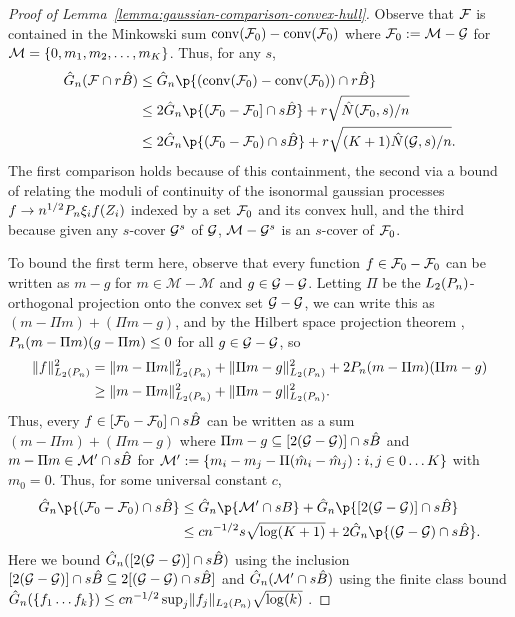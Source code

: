 \begin{proof}[Proof of Lemma~\ref{lemma:gaussian-comparison-convex-hull}]
Observe that $\mathcal{F}$ is contained in the Minkowski sum $\operatorname*{conv}(\mathcal{F}_0)-\operatorname*{conv}(\mathcal{F}_0)$
where $\mathcal{F}_0 := \mathcal M - \mathcal{G}$ for $\mathcal M = \{0, m_1, m_2, \ldots, m_K\}$. Thus, for any $s$,
\begin{align*} 
\hat G_n(\F \cap r \hat B) 
&\le \hat G_n\p{(\conv(\F_0) - \conv(\F_0)) \cap r \hat B} \\
&\le 2\hat G_n\p{(\F_0 - \F_0] \cap s \hat B} + r \sqrt{\hat N(\F_0, s)/n} \\
&\le 2\hat G_n\p{(\F_0 - \F_0) \cap s \hat B} + r \sqrt{(K+1)\hat N(\GG, s)/n}. 
\end{align*}
The first comparison holds because of this containment, the second via a bound of \citet[Theorem 1]{bousquet2002some}
relating the moduli of continuity of the isonormal gaussian processes $f \to n^{1/2}\Pn \xi_i f(Z_i)$
indexed by a set $\mathcal{F}_0$ and its convex hull, and the third because given any $s$-cover $\mathcal{G}^s$ 
of $\mathcal{G}$, $\mathcal M -  \mathcal{G}^s$ is an $s$-cover of $\mathcal{F}_0$.

To bound the first term here, observe that every function $f \in \mathcal{F}_0-\mathcal{F}_0$
can be written as $m - g$ for $m \in \mathcal M - \mathcal M$ and $g \in \mathcal{G}-\mathcal{G}$.
Letting $\Pi$ be the $L_2(\Pn)$-orthogonal projection onto the convex set $\mathcal{G}-\mathcal{G}$, we can write this as
$(m - \Pi m) + (\Pi m - g)$, and by the Hilbert space projection theorem \citep[Proposition 1.37]{peypouquet2015convex},
$\Pn (m-\Pi m) (g-\Pi m) \le 0$ for all $g \in \mathcal{G}-\mathcal{G}$, so
\begin{align*} 
\norm{f}_{L_2(\Pn)}^2 &= \norm{m - \Pi m}_{L_2(\Pn)}^2 + \norm{\Pi m - g}_{L_2(\Pn)}^2 + 2 \Pn (m-\Pi m)(\Pi m - g) \\
		    &\ge \norm{m - \Pi m}_{L_2(\Pn)}^2 + \norm{\Pi m - g}_{L_2(\Pn)}^2. 
\end{align*}
Thus, every $f \in [\mathcal{F}_0 - \mathcal{F}_0] \cap s\hat B$ can be written as a sum $(m-\Pi m) + (\Pi m - g)$ 
where $\Pi m - g \subseteq [2(\mathcal{G}-\mathcal{G})] \cap s\hat B$ and 
$m-\Pi m \in \mathcal M' \cap s \hat B$ for $\mathcal M' := \{m_i - m_j - \Pi (\hat m_i - \hat m_j) : i,j \in 0 \ldots K\}$ with $m_0=0$.
Thus, for some universal constant $c$, 
\begin{align*}
\hat G_n\p{(\F_0 - \F_0) \cap s \hat B} 
&\le \hat G_n\p{\MM' \cap s B} + \hat G_n\p{[2(\GG-\GG)] \cap s \hat B} \\
&\le c n^{-1/2} s \sqrt{\log(K+1)} +  2 \hat G_n\p{(\GG-\GG) \cap s \hat B}. 
\end{align*}
Here we bound $\hat G_n([2(\mathcal{G}-\mathcal{G})] \cap s \hat B)$ using the inclusion $[2(\mathcal{G}-\mathcal{G})] \cap s \hat B \subseteq 2[(\mathcal{G} - \mathcal{G}) \cap s \hat B]$
and $\hat G_n(\mathcal M' \cap s \hat B)$ using the finite class bound 
$\hat G_n(\set{f_1 \ldots f_k}) \le cn^{-1/2}\sup_{j}\norm{f_j}_{L_2(\Pn)} \sqrt{\log(k)}$ \citep[e.g.,][Exercise 7.5.10]{vershynin2018high}.
\end{proof}



